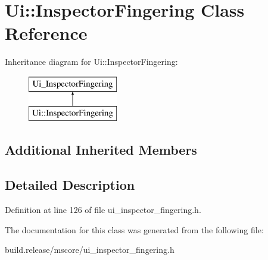 \hypertarget{class_ui_1_1_inspector_fingering}{}\section{Ui\+:\+:Inspector\+Fingering Class Reference}
\label{class_ui_1_1_inspector_fingering}
Inheritance diagram for Ui\+:\+:Inspector\+Fingering\+:\begin{figure}[H]
\begin{center}
\leavevmode
\includegraphics[height=2.000000cm]{class_ui_1_1_inspector_fingering}
\end{center}
\end{figure}
\subsection*{Additional Inherited Members}


\subsection{Detailed Description}


Definition at line 126 of file ui\+\_\+inspector\+\_\+fingering.\+h.



The documentation for this class was generated from the following file\+:\begin{DoxyCompactItemize}
\item 
build.\+release/mscore/ui\+\_\+inspector\+\_\+fingering.\+h\end{DoxyCompactItemize}
